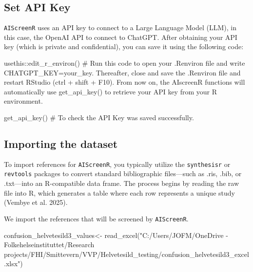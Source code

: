 \documentclass[
  letterpaper,
  DIV=11,
  numbers=noendperiod]{scrartcl}
\newenvironment{Shaded}{\begin{snugshade}}{\end{snugshade}}
\newcommand{\CommentTok}[1]{\textcolor[rgb]{0.37,0.37,0.37}{#1}}
\newcommand{\FunctionTok}[1]{\textcolor[rgb]{0.28,0.35,0.67}{#1}}
\newcommand{\NormalTok}[1]{\textcolor[rgb]{0.00,0.23,0.31}{#1}}
\newcommand{\OtherTok}[1]{\textcolor[rgb]{0.00,0.23,0.31}{#1}}
\newcommand{\SpecialCharTok}[1]{\textcolor[rgb]{0.37,0.37,0.37}{#1}}
\newcommand{\StringTok}[1]{\textcolor[rgb]{0.13,0.47,0.30}{#1}}
\begin{document}
\subsection{Set API Key}\label{set-api-key}

\texttt{AIScreenR} uses an API key to connect to a Large Language Model
(LLM), in this case, the OpenAI API to connect to ChatGPT. After
obtaining your API key (which is private and confidential), you can save
it using the following code:

\begin{Shaded}
\begin{Highlighting}[]
\NormalTok{usethis}\SpecialCharTok{::}\FunctionTok{edit\_r\_environ}\NormalTok{() }\CommentTok{\# Run this code to open your .Renviron file and  write CHATGPT\_KEY=your\_key. Thereafter, close and save the .Renviron file and restart RStudio (ctrl + shift + F10). From now on, the AIscreenR functions will automatically use get\_api\_key() to retrieve your API key from your R environment. }

\FunctionTok{get\_api\_key}\NormalTok{() }\CommentTok{\# To check the API Key was saved successfully.}
\end{Highlighting}
\end{Shaded}

\subsection{Importing the dataset}\label{importing-the-dataset}

To import references for \texttt{AIScreenR}, you typically utilize the
\texttt{synthesisr} or \texttt{revtools} packages to convert standard
bibliographic files---such as .ris, .bib, or .txt---into an R-compatible
data frame. The process begins by reading the raw file into R, which
generates a table where each row represents a unique study (Vembye et
al. 2025).

We import the references that will be screened by \texttt{AIScreenR}.

\begin{Shaded}
\begin{Highlighting}[]
\NormalTok{confusion\_helvetesild3\_values}\OtherTok{\textless{}{-}} \FunctionTok{read\_excel}\NormalTok{(}\StringTok{"C:/Users/JOFM/OneDrive {-} Folkehelseinstituttet/Research projects/FHI/Smittevern/VVP/Helvetesild\_testing/confusion\_helvetesild3\_excel.xlsx"}\NormalTok{)}
\end{Highlighting}
\end{Shaded}
\end{document}
